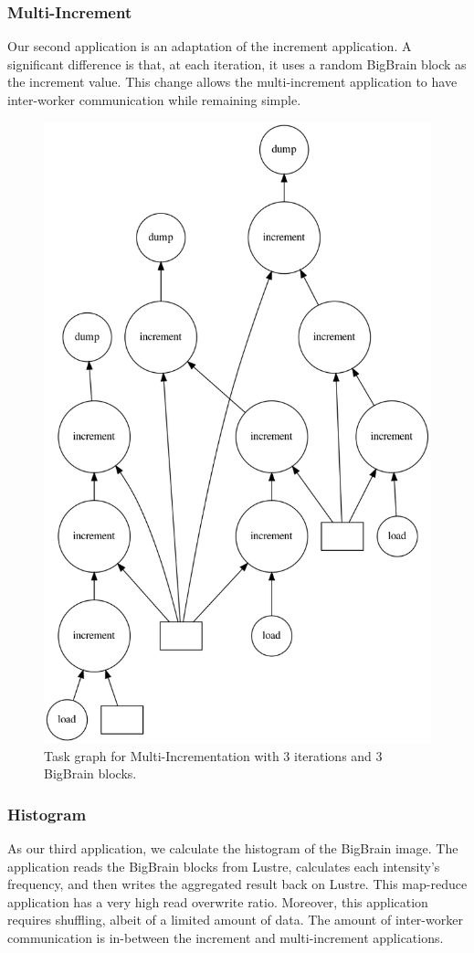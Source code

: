 \documentclass[conference]{IEEEtran}
\begin{document}
% 
\subsubsection{Multi-Increment}
Our second application is an adaptation of the increment application. A
significant difference is that, at each iteration, it uses a random
BigBrain block as the increment value. This change allows the
multi-increment application to have inter-worker communication while
remaining simple.

\begin{figure}[!hb]
	\centering
	\includegraphics[height=\columnwidth,
	angle=0]{figures/multi-increment.png}
	\caption{Task graph for Multi-Incrementation with 3 iterations and 3 BigBrain blocks.}
	\label{fig:graph-muti-increment}
\end{figure}
	
\subsubsection{Histogram}
As our third application, we calculate the histogram of the BigBrain image. 
The application reads the BigBrain blocks from Lustre, calculates each intensity's frequency, and then writes the aggregated result back on Lustre.
This map-reduce application has a very high read overwrite ratio.
Moreover, this application requires shuffling, albeit of a limited amount of data. 
The amount of inter-worker communication is in-between the increment and multi-increment applications.
\end{document}
